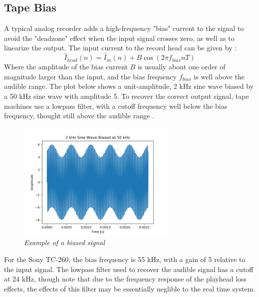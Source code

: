 \documentclass[twoside,a4paper]{article}
\begin{document}
\subsection{Tape Bias}
A typical analog recorder adds a high-frequency "bias"
current to the signal to avoid the "deadzone" effect when the input signal
crosses zero, as well as to linearize the output. The input
current to the record head can be given by
\cite{Camras:1987:MRH:27189}:
\begin{equation}
    \hat{I}_{head}(n) = \hat{I}_{in}(n) + B \cos(2 \pi f_{bias} n T)
\end{equation}
%
Where the amplitude of the bias current $B$ is usually
about one order of magnitude larger than the input,
and the bias frequency $f_{bias}$ is well above the
audible range. The plot below shows a unit-amplitude,
2 kHz sine wave biased by a 50 kHz sine wave with amplitude 5.
To recover the correct output signal, tape machines use a
lowpass filter, with a cutoff frequency well below the bias
frequency, thought still above the audible range \cite{Kadis}.
\begin{figure}[ht]
    \center
    \includegraphics[width=3in]{../Simulations/Bias/BiasEx.png}
    \caption{\label{Bias}{\it Example of a biased signal}}
\end{figure}
\newline\newline
For the Sony TC-260, the bias frequency is 55 kHz, with a gain
of 5 relative to the input signal. The lowpass filter used to recover
the audible signal has a cutoff at 24 kHz, though note that due to
the frequency response of the playhead loss effects, the effects
of this filter may be essentially neglible to the real time system.
\cite{RefManual}
\end{document}
